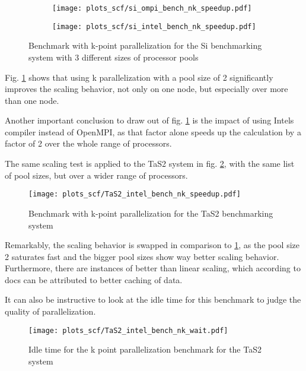 \documentclass[main.tex]{subfiles}
\begin{document}
\begin{figure}[h!]
\begin{subfigure}[b]{0.49\textwidth}
    \centering
    \texttt{[image: plots\_scf/si\_ompi\_bench\_nk\_speedup.pdf]}
\end{subfigure}
\begin{subfigure}[b]{0.49\textwidth}
    \centering
    \texttt{[image: plots\_scf/si\_intel\_bench\_nk\_speedup.pdf]}
\end{subfigure}
\caption{Benchmark with k-point parallelization for the Si benchmarking system with 3 different sizes of processor pools}
\label{fig:scaling_nk_si}
\end{figure}

Fig. \ref{fig:scaling_nk_si} shows that using k parallelization with a pool size of 2 significantly improves the scaling behavior, not only on one node, but especially over more than one node.


Another important conclusion to draw out of fig. \ref{fig:scaling_nk_si} is the impact of using Intels compiler instead of OpenMPI, as that factor alone speeds up the calculation by a factor of 2 over the whole range of processors.

The same scaling test is applied to the TaS2 system in fig. \ref{fig:scaling_nk_tas2}, with the same list of pool sizes, but over a wider range of processors.

\begin{figure}[h!]
    \centering
    \texttt{[image: plots\_scf/TaS2\_intel\_bench\_nk\_speedup.pdf]}
    \caption{Benchmark with k-point parallelization for the TaS2 benchmarking system}
    \label{fig:scaling_nk_tas2}
\end{figure}

Remarkably, the scaling behavior is swapped in comparison to \ref{fig:scaling_nk_si}, as the pool size 2 saturates fast and the bigger pool sizes show way better scaling behavior.
Furthermore, there are instances of better than linear scaling, which according to \QE docs can be attributed to better caching of data.

It can also be instructive to look at the idle time for this benchmark to judge the quality of parallelization. 

\begin{figure}[h!]
    \centering
    \texttt{[image: plots\_scf/TaS2\_intel\_bench\_nk\_wait.pdf]}
    \caption{Idle time for the k point parallelization benchmark for the TaS2 system}
    \label{fig:scaling_nk_tas2_wait}
\end{figure}
\end{document}

